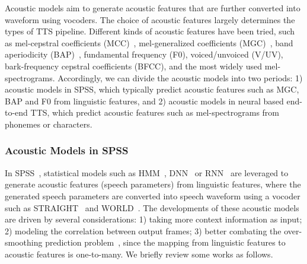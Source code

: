 \documentclass{article}
\begin{document}
Acoustic models aim to generate acoustic features that are further converted into waveform using vocoders. The choice of acoustic features largely determines the types of TTS pipeline. Different kinds of acoustic features have been tried, such as mel-cepstral coefficients (MCC)~\cite{fukada1992adaptive}, mel-generalized coefficients (MGC)~\cite{tokuda1994mel}, band aperiodicity (BAP)~\cite{kawahara1999restructuring,kawahara2001aperiodicity}, fundamental frequency (F0), voiced/unvoiced (V/UV), bark-frequency cepstral coefficients (BFCC), and the most widely used mel-spectrograms. Accordingly, we can divide the acoustic models into two periods: 1) acoustic models in SPSS, which typically predict acoustic features such as MGC, BAP and F0 from linguistic features, and 2) acoustic models in neural based end-to-end TTS, which predict acoustic features such as mel-spectrograms from phonemes or characters.






\subsubsection{Acoustic Models in SPSS} 
In SPSS~\cite{zen2009statistical,tokuda2013speech}, statistical models such as HMM~\cite{yoshimura1999simultaneous,tokuda2000speech}, DNN~\cite{zen2013statistical,qian2014training} or RNN~\cite{fan2014tts,zen2015unidirectional} are leveraged to generate acoustic features (speech parameters) from linguistic features, where the generated speech parameters are converted into speech waveform using a vocoder such as STRAIGHT~\cite{kawahara2006straight} and WORLD~\cite{morise2016world}. The developments of these acoustic models are driven by several considerations: 1) taking more context information as input; 2) modeling the correlation between output frames; 3) better combating the over-smoothing prediction problem~\cite{zen2009statistical}, since the mapping from linguistic features to acoustic features is one-to-many. We briefly review some works as follows.
\end{document}
